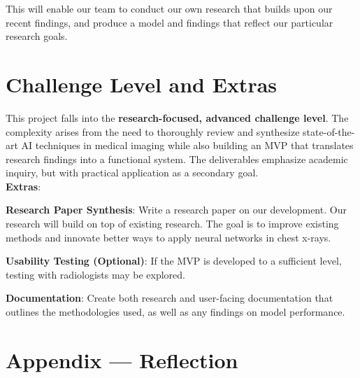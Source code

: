 \documentclass{article}
\begin{document}
This will enable our team to conduct our own research that builds upon our recent findings, and produce a model and findings that reflect our particular research goals.


\section{Challenge Level and Extras}
This project falls into the \textbf{research-focused, advanced challenge level}. The complexity arises from the need to thoroughly review and synthesize state-of-the-art AI techniques in medical imaging while also building an MVP that translates research findings into a functional system. The deliverables emphasize academic inquiry, but with practical application as a secondary goal.\\

\textbf{Extras}:
\begin{itemize}
\begin{item}
    \textbf{Research Paper Synthesis}: Write a research paper on our development. Our research will build on top of existing research. The goal is to improve existing methods and innovate better ways to apply neural networks in chest x-rays.
\end{item}
\begin{item}
    \textbf{Usability Testing (Optional)}: If the MVP is developed to a sufficient level, testing with radiologists may be explored.
\end{item}
\begin{item}
\textbf{Documentation}: Create both research and user-facing documentation that outlines the methodologies used, as well as any findings on model performance.
\end{item}
\end{itemize}

\newpage{}

\section*{Appendix --- Reflection}
\end{document}
